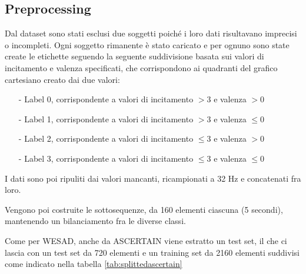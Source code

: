 \subsection{Preprocessing}
Dal dataset sono stati esclusi due soggetti poiché i loro dati risultavano imprecisi o incompleti. Ogni soggetto rimanente è stato caricato e per ognuno sono state create le etichette seguendo la seguente suddivisione basata sui valori di incitamento e valenza specificati, che corrispondono ai quadranti del grafico cartesiano creato dai due valori:
\begin{itemize}
    \item[-] Label 0, corrispondente a valori di incitamento $> 3$ e valenza $> 0$
    \item[-] Label 1, corrispondente a valori di incitamento $> 3$ e valenza $\leq 0$
    \item[-] Label 2, corrispondente a valori di incitamento $\leq 3$ e valenza $> 0$
    \item[-] Label 3, corrispondente a valori di incitamento $\leq 3$ e valenza $\leq 0$
\end{itemize}

I dati sono poi ripuliti dai valori mancanti, ricampionati a 32 Hz e concatenati fra loro.



Vengono poi costruite le sottosequenze, da 160 elementi ciascuna (5 secondi), mantenendo un bilanciamento fra le diverse classi.


Come per WESAD, anche da ASCERTAIN viene estratto un test set, il che ci lascia con un test set da 720 elementi e un training set da 2160 elementi suddivisi come indicato nella tabella \ref{tab:splittedascertain}

